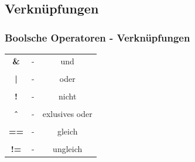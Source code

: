 \documentclass[final]{beamer}
\begin{document}
\subsection{Verknüpfungen}
\begin{frame}
	\frametitle{Boolsche Operatoren - Verknüpfungen}
	\begin{tabular}{c c c}
		\textbf{\&}  & - & und \\&&\\
		\textbf{|} & - & oder \\&&\\
		\textbf{!} & - & nicht \\&&\\
		\textbf{\^\ }  & - &  exlusives oder \\&&\\
		\textbf{==} & - & gleich \\&&\\
		\textbf{!=} & - & ungleich \\
	\end{tabular}
	\
\end{frame}
\end{document}
